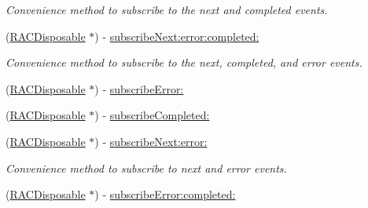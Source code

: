 \begin{DoxyCompactItemize}
\begin{DoxyCompactList}\small\item\em Convenience method to subscribe to the {\ttfamily next} and {\ttfamily completed} events. \end{DoxyCompactList}\item 
\mbox{\label{category_r_a_c_signal_07_subscription_08_a50b7b51715316c5da372cc0cf96039f6}} 
(\mbox{\hyperlink{interface_r_a_c_disposable}{R\+A\+C\+Disposable}} $\ast$) -\/ \mbox{\hyperlink{category_r_a_c_signal_07_subscription_08_a50b7b51715316c5da372cc0cf96039f6}{subscribe\+Next\+:error\+:completed\+:}}
\begin{DoxyCompactList}\small\item\em Convenience method to subscribe to the {\ttfamily next}, {\ttfamily completed}, and {\ttfamily error} events. \end{DoxyCompactList}\item 
(\mbox{\hyperlink{interface_r_a_c_disposable}{R\+A\+C\+Disposable}} $\ast$) -\/ \mbox{\hyperlink{category_r_a_c_signal_07_subscription_08_a6e792da9c8499ad5791e14bd126e99cb}{subscribe\+Error\+:}}
\item 
(\mbox{\hyperlink{interface_r_a_c_disposable}{R\+A\+C\+Disposable}} $\ast$) -\/ \mbox{\hyperlink{category_r_a_c_signal_07_subscription_08_a3927c94bfca5db9dad133dd7c45563f3}{subscribe\+Completed\+:}}
\item 
\mbox{\label{category_r_a_c_signal_07_subscription_08_a2fc221c95206c024d074a23cf7efc480}} 
(\mbox{\hyperlink{interface_r_a_c_disposable}{R\+A\+C\+Disposable}} $\ast$) -\/ \mbox{\hyperlink{category_r_a_c_signal_07_subscription_08_a2fc221c95206c024d074a23cf7efc480}{subscribe\+Next\+:error\+:}}
\begin{DoxyCompactList}\small\item\em Convenience method to subscribe to {\ttfamily next} and {\ttfamily error} events. \end{DoxyCompactList}\item 
\mbox{\label{category_r_a_c_signal_07_subscription_08_aad432a4ebbe885ea4bb606097a60e474}} 
(\mbox{\hyperlink{interface_r_a_c_disposable}{R\+A\+C\+Disposable}} $\ast$) -\/ \mbox{\hyperlink{category_r_a_c_signal_07_subscription_08_aad432a4ebbe885ea4bb606097a60e474}{subscribe\+Error\+:completed\+:}}

\end{DoxyCompactItemize}

